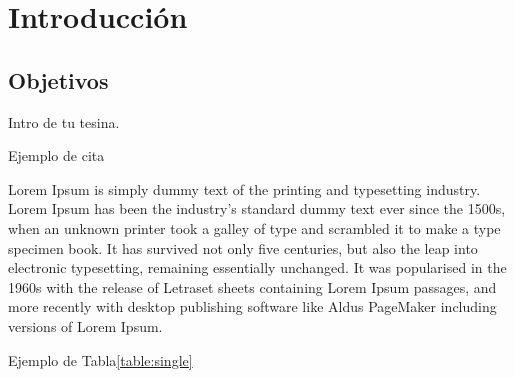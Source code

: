 \chapter{Introducción}\label{cap:intro}

\section{Objetivos}\label{cap:intro:sec:obj}

Intro de tu tesina.

Ejemplo de cita\cite{esp:blast2}

Lorem Ipsum is simply dummy text of the printing and typesetting industry.
Lorem Ipsum has been the industry's standard dummy text ever since the 1500s,
when an unknown printer took a galley of type and scrambled it to make a type
specimen book. It has survived not only five centuries, but also the leap into
electronic typesetting, remaining essentially unchanged. It was popularised in
the 1960s with the release of Letraset sheets containing Lorem Ipsum passages,
and more recently with desktop publishing software like Aldus PageMaker
including versions of Lorem Ipsum.



Ejemplo de Tabla\ref{table:single}
